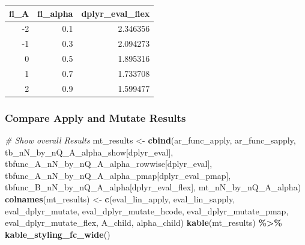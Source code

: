 \documentclass[
]{book}
\newenvironment{Shaded}{\begin{snugshade}}{\end{snugshade}}
\newcommand{\CommentTok}[1]{\textcolor[rgb]{0.56,0.35,0.01}{\textit{#1}}}
\newcommand{\KeywordTok}[1]{\textcolor[rgb]{0.13,0.29,0.53}{\textbf{#1}}}
\newcommand{\NormalTok}[1]{#1}
\newcommand{\OperatorTok}[1]{\textcolor[rgb]{0.81,0.36,0.00}{\textbf{#1}}}
\newcommand{\StringTok}[1]{\textcolor[rgb]{0.31,0.60,0.02}{#1}}
\begin{document}
\begin{table}[!h]
\centering
\begin{tabular}{r|r|r}
\hline
fl\_A & fl\_alpha & dplyr\_eval\_flex\\
\hline
\rowcolor{gray!6}  -2 & 0.1 & 2.346356\\
\hline
-1 & 0.3 & 2.094273\\
\hline
\rowcolor{gray!6}  0 & 0.5 & 1.895316\\
\hline
1 & 0.7 & 1.733708\\
\hline
\rowcolor{gray!6}  2 & 0.9 & 1.599477\\
\hline
\end{tabular}
\end{table}

\hypertarget{compare-apply-and-mutate-results}{%
\subsubsection{Compare Apply and Mutate Results}\label{compare-apply-and-mutate-results}}

\begin{Shaded}
\begin{Highlighting}[]
\CommentTok{\# Show overall Results}
\NormalTok{mt\_results \textless{}{-}}\StringTok{ }\KeywordTok{cbind}\NormalTok{(ar\_func\_apply, ar\_func\_sapply,}
\NormalTok{                    tb\_nN\_by\_nQ\_A\_alpha\_show[}\StringTok{\textquotesingle{}dplyr\_eval\textquotesingle{}}\NormalTok{],}
\NormalTok{                    tbfunc\_A\_nN\_by\_nQ\_A\_alpha\_rowwise[}\StringTok{\textquotesingle{}dplyr\_eval\textquotesingle{}}\NormalTok{],}
\NormalTok{                    tbfunc\_A\_nN\_by\_nQ\_A\_alpha\_pmap[}\StringTok{\textquotesingle{}dplyr\_eval\_pmap\textquotesingle{}}\NormalTok{],}
\NormalTok{                    tbfunc\_B\_nN\_by\_nQ\_A\_alpha[}\StringTok{\textquotesingle{}dplyr\_eval\_flex\textquotesingle{}}\NormalTok{],}
\NormalTok{                    mt\_nN\_by\_nQ\_A\_alpha)}
\KeywordTok{colnames}\NormalTok{(mt\_results) \textless{}{-}}\StringTok{ }\KeywordTok{c}\NormalTok{(}\StringTok{\textquotesingle{}eval\_lin\_apply\textquotesingle{}}\NormalTok{, }\StringTok{\textquotesingle{}eval\_lin\_sapply\textquotesingle{}}\NormalTok{,}
                          \StringTok{\textquotesingle{}eval\_dplyr\_mutate\textquotesingle{}}\NormalTok{,}
                          \StringTok{\textquotesingle{}eval\_dplyr\_mutate\_hcode\textquotesingle{}}\NormalTok{,}
                          \StringTok{\textquotesingle{}eval\_dplyr\_mutate\_pmap\textquotesingle{}}\NormalTok{,}
                          \StringTok{\textquotesingle{}eval\_dplyr\_mutate\_flex\textquotesingle{}}\NormalTok{,}
                          \StringTok{\textquotesingle{}A\_child\textquotesingle{}}\NormalTok{, }\StringTok{\textquotesingle{}alpha\_child\textquotesingle{}}\NormalTok{)}
\KeywordTok{kable}\NormalTok{(mt\_results) }\OperatorTok{\%\textgreater{}\%}
\StringTok{  }\KeywordTok{kable\_styling\_fc\_wide}\NormalTok{()}
\end{Highlighting}
\end{Shaded}
\end{document}
